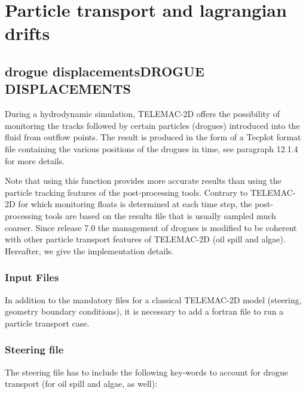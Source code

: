 





\chapter{ Particle transport and lagrangian drifts}


\section{ drogue displacementsDROGUE DISPLACEMENTS}

 During a hydrodynamic simulation, TELEMAC-2D offers the possibility of monitoring the tracks followed by certain particles (drogues) introduced into the fluid from outflow points. The result is produced in the form of a Tecplot format file containing the various positions of the drogues in time, see paragraph 12.1.4 for more details.

 Note that using this function provides more accurate results than using the particle tracking features of the post-processing tools. Contrary to TELEMAC-2D for which monitoring floats is determined at each time step, the post-processing tools are based on the results file that is usually sampled much coarser. Since release 7.0 the management of drogues is modified to be coherent with other particle transport features of TELEMAC-2D (oil spill and algae). Hereafter, we give the implementation details.


\subsection{ Input Files}

 In addition to the mandatory files for a classical TELEMAC-2D model (steering, geometry boundary conditions), it is necessary to add a fortran file to run a particle transport case.


\subsection{ Steering file}

 The steering file has to include the following key-words to account for drogue transport (for oil spill and algae, as well):

